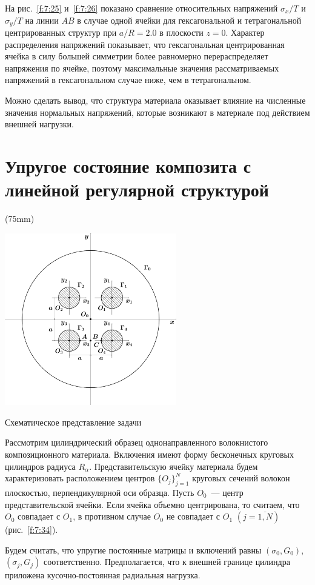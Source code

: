 На рис.~\ref{f:7:25} и~\ref{f:7:26} показано сравнение относительных напряжений $\sigma_x/T$ и $\sigma_y/T$ на линии $AB$ в случае одной ячейки для гексагональной и тетрагональной центрированных структур при $a/R=2.0$ в плоскости $z=0$. Характер распределения напряжений показывает, что гексагональная центрированная ячейка в силу большей симметрии более равномерно перераспределяет напряжения по ячейке, поэтому максимальные значения рассматриваемых напряжений в гексагональном случае ниже, чем в тетрагональном.

Можно сделать вывод, что структура материала оказывает влияние на численные значения нормальных напряжений, которые возникают в материале под действием внешней нагрузки.

\section{Упругое состояние композита с линейной регулярной структурой}

\sidefig*(75mm){
\includegraphics[width=7.5cm]{incl-scheme.pdf}
\caption{Схематическое представление задачи}
\label{f:7:34}
}{Рассмотрим цилиндрический образец однонаправленного волокнистого композиционного материала. Включения имеют форму бесконечных круговых цилиндров радиуса $R_\alpha$. Представительскую ячейку материала будем характеризовать расположением центров $\{O_j\}_{j=1}^N$ круговых сечений волокон плоскостью, перпендикулярной оси образца. Пусть $O_0$~--- центр представительской ячейки. Если ячейка объемно центрирована, то считаем, что $O_0$ совпадает с $O_1$, в противном случае $O_0$ не совпадает с $O_1$ $(j=\overline{1,N})$ (рис.~\ref{f:7:34}).}

Будем считать, что упругие постоянные матрицы и включений равны $(\sigma_0, G_0)$, $(\sigma_j,G_j)$ соответственно. Предполагается, что к внешней границе цилиндра приложена ку\-соч\-но-пос\-то\-ян\-ная радиальная нагрузка.


